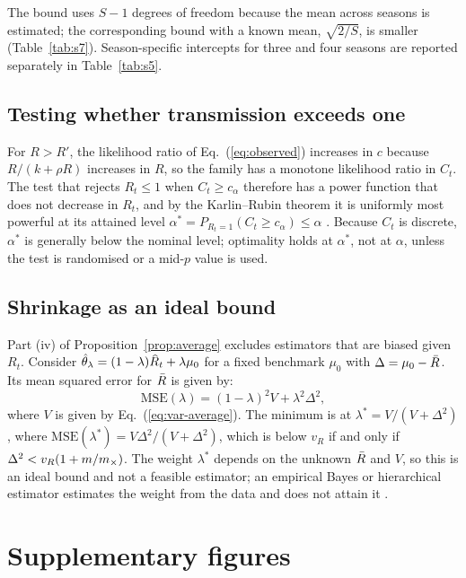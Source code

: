 The bound uses $S-1$ degrees of freedom because the mean across seasons is estimated; the corresponding bound with a known mean, $\sqrt{2/S}$, is smaller (Table~\ref{tab:s7}). Season-specific intercepts for three and four seasons are reported separately in Table~\ref{tab:s5}.

\subsection{Testing whether transmission exceeds one}
\label{app:ump}

For $R>R'$, the likelihood ratio of Eq.~(\ref{eq:observed}) increases in $c$ because $R/(k+\rho R)$ increases in $R$, so the family has a monotone likelihood ratio in $C_t$. The test that rejects $R_t\le1$ when $C_t\ge c_\alpha$ therefore has a power function that does not decrease in $R_t$, and by the Karlin--Rubin theorem it is uniformly most powerful at its attained level $\alpha^*=P_{R_t=1}(C_t\ge c_\alpha)\le\alpha$ \citep{karlin1956theory, lehmann2005testing}. Because $C_t$ is discrete, $\alpha^*$ is generally below the nominal level; optimality holds at $\alpha^*$, not at $\alpha$, unless the test is randomised or a mid-$p$ value is used.

\subsection{Shrinkage as an ideal bound}
\label{app:shrinkage}

Part (iv) of Proposition~\ref{prop:average} excludes estimators that are biased given $R_t$. Consider $\hat{\theta}_\lambda=(1-\lambda)\Rhat_t+\lambda\mu_0$ for a fixed benchmark $\mu_0$ with $\Delta=\mu_0-\bar{R}$. Its mean squared error for $\bar{R}$ is given by:
\begin{equation}
  \mathrm{MSE}(\lambda)=(1-\lambda)^2V+\lambda^2\Delta^2,
\end{equation}
where $V$ is given by Eq.~(\ref{eq:var-average}). The minimum is at $\lambda^*=V/(V+\Delta^2)$, where $\mathrm{MSE}(\lambda^*)=V\Delta^2/(V+\Delta^2)$, which is below $v_R$ if and only if $\Delta^2<v_R(1+m/m_{\times})$. The weight $\lambda^*$ depends on the unknown $\bar{R}$ and $V$, so this is an ideal bound and not a feasible estimator; an empirical Bayes or hierarchical estimator estimates the weight from the data and does not attain it \citep{stoner2019hierarchical}.

\clearpage
\section{Supplementary figures}
\label{app:figure}

